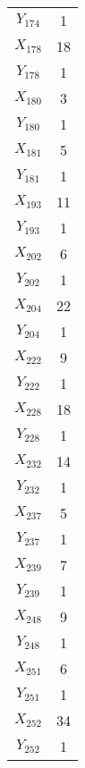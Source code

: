 \documentclass[a4paper,10pt]{article}
\begin{document}
\begin{center}
\begin{longtable}{cc}
$Y_{174}$ & 1 \\
$X_{178}$ & 18 \\
$Y_{178}$ & 1 \\
$X_{180}$ & 3 \\
$Y_{180}$ & 1 \\
$X_{181}$ & 5 \\
$Y_{181}$ & 1 \\
$X_{193}$ & 11 \\
$Y_{193}$ & 1 \\
$X_{202}$ & 6 \\
$Y_{202}$ & 1 \\
$X_{204}$ & 22 \\
$Y_{204}$ & 1 \\
$X_{222}$ & 9 \\
$Y_{222}$ & 1 \\
$X_{228}$ & 18 \\
$Y_{228}$ & 1 \\
$X_{232}$ & 14 \\
$Y_{232}$ & 1 \\
$X_{237}$ & 5 \\
$Y_{237}$ & 1 \\
$X_{239}$ & 7 \\
$Y_{239}$ & 1 \\
$X_{248}$ & 9 \\
$Y_{248}$ & 1 \\
$X_{251}$ & 6 \\
$Y_{251}$ & 1 \\
$X_{252}$ & 34 \\
$Y_{252}$ & 1 \\
\end{longtable}
\end{center}
\end{document}
